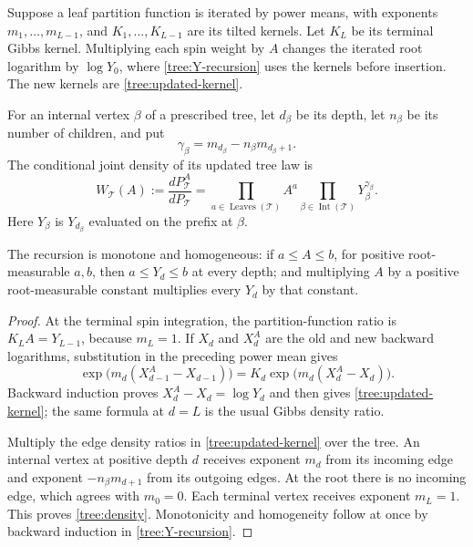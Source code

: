 \begin{lemma}\label{tree:insertion}
Suppose a leaf partition function is iterated by power means, with
exponents $m_1,\ldots,m_{L-1}$, and $K_1,\ldots,K_{L-1}$ are its tilted
kernels.  Let $K_L$ be its terminal Gibbs kernel.  Multiplying each spin
weight by $A$ changes the iterated root logarithm by $\log Y_0$, where
\eqref{tree:Y-recursion} uses the kernels before insertion.  The new
kernels are \eqref{tree:updated-kernel}.

For an internal vertex $\beta$ of a prescribed tree, let $d_\beta$ be
its depth, let $n_\beta$ be its number of children, and put
\[
  \gamma_\beta=m_{d_\beta}-n_\beta m_{d_\beta+1}.
\]
The conditional joint density of its updated tree law is
\begin{equation}\label{tree:density}
  W_{\mathcal T}(A)
  :=\frac{dP_{\mathcal T}^A}{dP_{\mathcal T}}
  =\prod_{a\in\operatorname{Leaves}(\mathcal T)}A^a
       \prod_{\beta\in\operatorname{Int}(\mathcal T)}
            Y_\beta^{\gamma_\beta}.
\end{equation}
Here $Y_\beta$ is $Y_{d_\beta}$ evaluated on the prefix at $\beta$.

The recursion is monotone and homogeneous: if $a\leq A\leq b$, for
positive root-measurable $a,b$, then $a\leq Y_d\leq b$ at every depth;
and multiplying $A$ by a positive root-measurable constant multiplies
every $Y_d$ by that constant.
\end{lemma}

\begin{proof}
At the terminal spin integration, the partition-function ratio is
$K_LA=Y_{L-1}$, because $m_L=1$.  If $X_d$ and $X_d^A$ are the old and
new backward logarithms, substitution in the preceding power mean
gives
\[
  \exp\bigl(m_d(X_{d-1}^A-X_{d-1})\bigr)
  =K_d\exp\bigl(m_d(X_d^A-X_d)\bigr).
\]
Backward induction proves $X_d^A-X_d=\log Y_d$ and then gives
\eqref{tree:updated-kernel}; the same formula at $d=L$ is the usual
Gibbs density ratio.

Multiply the edge density ratios in \eqref{tree:updated-kernel} over
the tree.  An internal vertex at positive depth $d$ receives exponent
$m_d$ from its incoming edge and exponent $-n_\beta m_{d+1}$ from its
outgoing edges.  At the root there is no incoming edge, which agrees
with $m_0=0$.  Each terminal vertex receives exponent $m_L=1$.
This proves \eqref{tree:density}.  Monotonicity and homogeneity follow
at once by backward induction in \eqref{tree:Y-recursion}.
\end{proof}

